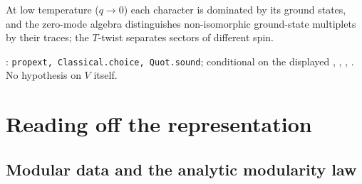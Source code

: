 \begin{physics}
At low temperature ($q\to0$) each character is dominated by its ground states, and the zero-mode algebra distinguishes
non-isomorphic ground-state multiplets by their traces; the $T$-twist separates sectors of different spin.
\end{physics}

\begin{status}
\allowbreak{}: \texttt{propext, Classical.choice, Quot.sound}; conditional on the
displayed , , , . No hypothesis on $V$ itself.
\end{status}

\section{Reading off the representation}\label{l15:sec:rho}

\subsection{Modular data and the analytic modularity law}

